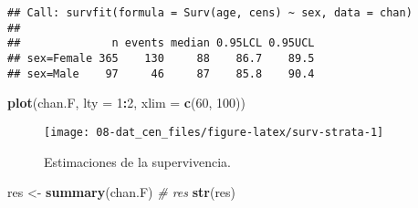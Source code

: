 \documentclass[
]{book}
\newenvironment{Shaded}{\begin{snugshade}}{\end{snugshade}}
\newcommand{\CommentTok}[1]{\textcolor[rgb]{0.56,0.35,0.01}{\textit{#1}}}
\newcommand{\DataTypeTok}[1]{\textcolor[rgb]{0.13,0.29,0.53}{#1}}
\newcommand{\DecValTok}[1]{\textcolor[rgb]{0.00,0.00,0.81}{#1}}
\newcommand{\KeywordTok}[1]{\textcolor[rgb]{0.13,0.29,0.53}{\textbf{#1}}}
\newcommand{\NormalTok}[1]{#1}
\newcommand{\OperatorTok}[1]{\textcolor[rgb]{0.81,0.36,0.00}{\textbf{#1}}}
\newcommand{\StringTok}[1]{\textcolor[rgb]{0.31,0.60,0.02}{#1}}
\theoremstyle{definition}
\theoremstyle{definition}
\theoremstyle{definition}
\theoremstyle{remark}
\begin{document}
\begin{Shaded}
\end{Shaded}

\begin{verbatim}
## Call: survfit(formula = Surv(age, cens) ~ sex, data = chan)
## 
##              n events median 0.95LCL 0.95UCL
## sex=Female 365    130     88    86.7    89.5
## sex=Male    97     46     87    85.8    90.4
\end{verbatim}

\begin{Shaded}
\begin{Highlighting}[]
\KeywordTok{plot}\NormalTok{(chan.F, }\DataTypeTok{lty =} \DecValTok{1}\OperatorTok{:}\DecValTok{2}\NormalTok{, }\DataTypeTok{xlim =} \KeywordTok{c}\NormalTok{(}\DecValTok{60}\NormalTok{, }\DecValTok{100}\NormalTok{))}
\end{Highlighting}
\end{Shaded}

\begin{figure}[!htb]

{\centering \texttt{[image: 08-dat\_cen\_files/figure-latex/surv-strata-1]} 

}

\caption{Estimaciones de la supervivencia.}\label{fig:surv-strata}
\end{figure}

\begin{Shaded}
\begin{Highlighting}[]
\NormalTok{res <-}\StringTok{ }\KeywordTok{summary}\NormalTok{(chan.F)}
\CommentTok{# res}
\KeywordTok{str}\NormalTok{(res)}
\end{Highlighting}
\end{Shaded}
\end{document}
